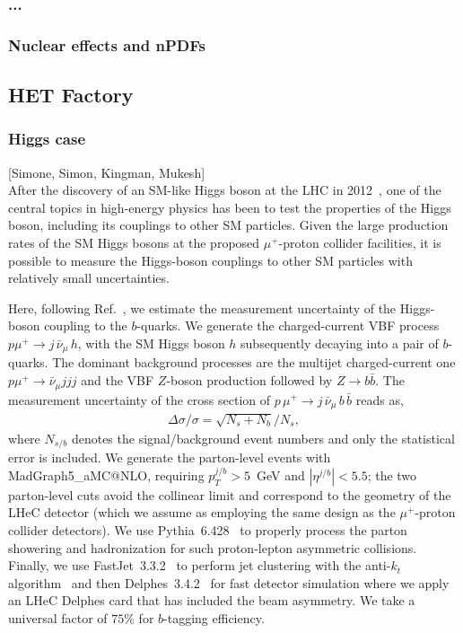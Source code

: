\documentclass[a4paper,11pt]{article}
\makeatletter
\newcommand{\mgamcnlo}{MadGraph5\_aMC@NLO}
\makeatother
\begin{document}
\subsubsection{...}
\subsubsection{Nuclear effects and nPDFs}


\subsection{HET Factory}
\subsubsection{Higgs case}

[Simone, Simon, Kingman, Mukesh]\\

After the discovery of an SM-like Higgs boson at the LHC in 2012~\cite{ATLAS:2012yve,CMS:2012qbp}, one of the central topics in high-energy physics has been to test the properties of the Higgs boson, including its couplings to other SM particles.
Given the large production rates of the SM Higgs bosons at the proposed $\mu^+$-proton collider facilities, it is possible to measure the Higgs-boson couplings to other SM particles with relatively small uncertainties.

Here, following Ref.~\cite{Cheung:2021iev}, we estimate the measurement uncertainty of the Higgs-boson coupling to the $b$-quarks.
We generate the charged-current VBF process $p \mu^+\to j \, \bar{\nu}_\mu \, h$, with the SM Higgs boson $h$ subsequently decaying into a pair of $b$-quarks.
The dominant background processes are the multijet charged-current one $p\mu^+ \to \bar{\nu}_\mu j j j$ and the VBF $Z$-boson production followed by $Z\to b\bar{b}$.
The measurement uncertainty of the cross section of $p \, \mu^+\to j \, \bar{\nu}_\mu \, b\,\bar{b}$ reads as,
\begin{eqnarray}
    \Delta\sigma/\sigma=\sqrt{N_s+N_b}/N_s,
\end{eqnarray}
where $N_{s/b}$ denotes the signal/background event numbers and only the statistical error is included.
We generate the parton-level events with \mgamcnlo, requiring $p_T^{j/b}>5$~GeV and $|\eta^{j/b}|<5.5$; the two parton-level cuts avoid the collinear limit and correspond to the geometry of the LHeC detector (which we assume as employing the same design as the $\mu^+$-proton collider detectors).
We use Pythia~6.428~\cite{Sjostrand:2006za} to properly process the parton showering and hadronization for such proton-lepton asymmetric collisions.
Finally, we use FastJet~3.3.2~\cite{Cacciari:2011ma,Cacciari:2005hq} to perform jet clustering with the anti-$k_t$ algorithm~\cite{Cacciari:2008gp} and then Delphes~3.4.2~\cite{deFavereau:2013fsa} for fast detector simulation where we apply an LHeC Delphes card that has included the beam asymmetry.
We take a universal factor of $75\%$ for $b$-tagging efficiency.
\end{document}
